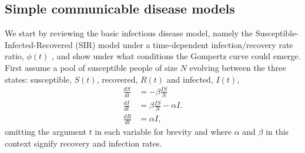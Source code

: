 \documentclass{article}
\begin{document}
\subsection*{Simple communicable disease models}
We start by reviewing the basic infectious disease model, namely the Susceptible-Infected-Recovered (SIR) model under a time-dependent infection/recovery rate ratio, $\phi(t)$ \cite{kermack1927contribution}, and show under what conditions the Gompertz curve could emerge. First assume a pool of susceptible people of size $N$ evolving between the three states: susceptible, $S(t)$, recovered, $R(t)$ and infected, $I(t)$,
\begin{align}
\label{eq:SIR}
\frac{dS}{dt}& = -\beta \frac{IS}{N}\nonumber\\
\frac{dI}{dt}& = \beta \frac{IS}{N} - \alpha I.\\
\frac{dR}{dt}& = \alpha I\nonumber,
\end{align}
omitting the argument $t$ in each variable for brevity and where $\alpha$ and $\beta$ in this context signify recovery and infection rates.
\end{document}
